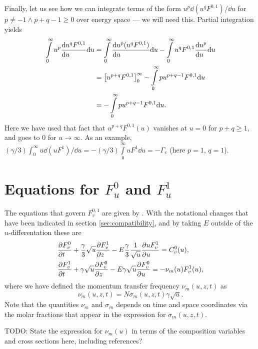 \documentclass{book}
\begin{document}
Finally, let us see how we can integrate terms of the form $u^p\dd{(u^q F^{0,1})}/\dd{u}$
for $p\neq -1 \wedge p+q-1\geq 0$ over energy space --- we will need this. Partial integration yields
\begin{align}
	\int\limits_0^\infty u^p\DERIV{u^q F^{0,1}}{u}\dd{u}
	&=
	 \int\limits_0^\infty \DERIV{u^p(u^qF^{0,1})}{u}\dd{u}
	-\int\limits_0^\infty u^qF^{0,1}\DERIV{u^p}{u}\dd{u}
	\nonumber \\
	&=
	 \left[u^{p+q}F^{0,1}\right]_0^\infty
	-\int\limits_0^\infty pu^{p+q-1}F^{0,1}\dd{u}
	\nonumber \\
	&=
	-\int\limits_0^\infty pu^{p+q-1}F^{0,1}\dd{u}.
	\label{eq:upduqF/du-int}
\end{align}
Here we have used that fact that $u^{p+q}F^{0,1}(u)$ vanishes at $u=0$ for $p+q\geq 1$,
and goes to $0$ for $u\rightarrow\infty$. As an example,
$ (\gamma/3)\int_0^\infty u\dd{(uF^1)}/\dd{u}
 =
 -(\gamma/3)\int\limits_0^\infty uF^1\dd{u}=-\Gamma_e$
(here $p=1$, $q=1$).


\section{Equations for $F^0_u$ and $F^1_u$}

The equations that govern $F^{0,1}_v$ are given by \cite[eq. 5--6]{Hagelaar2005}.
With the notational changes that have been indicated in section \ref{sec:compatibility},
and by taking $E$ outside of the $u$-differentation these are
\begin{align}
	&\PDEV{F_v^0}{t}
	+ \frac{\gamma}{3}\sqrt{u}\PDEV{F_v^1}{z}
	- E\frac{\gamma}{3}\frac{1}{\sqrt{u}}\PDEV{u F_v^1}{u}
	= C_v^0(u),
	\label{eq:ebe-2term-hagelaar-F-v0} \\
	&\PDEV{F_v^1}{t}
	+ \gamma \sqrt{u}\PDEV{F_v^0}{z}
	- E\gamma \sqrt{u}\PDEV{F_v^0}{u}
	= -\nu_m(u) F_v^1(u),
	\label{eq:ebe-2term-hagelaar-F-v1}
\end{align}
where we have defined the momentum transfer frequency $\nu_m(u,z,t)$ as
\begin{equation}
	\nu_m(u,z,t) = N\sigma_m(u,z,t)\gamma \sqrt{u}.
	\label{eq:nu_m}
\end{equation}
Note that the quantities $\nu_m$ and $\sigma_m$ depends on time and space
coordinates via the molar fractions that appear in the expression for
$\sigma_m(u,z,t)$.
\begin{framed}
	TODO: State the expression for $\nu_m(u)$ in terms of the composition
	variables and cross sections here, including references?
\end{framed}
\end{document}
